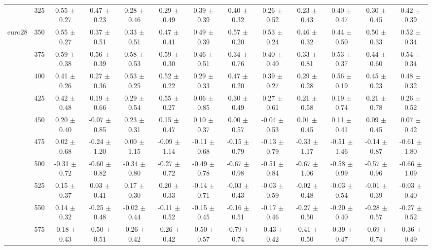 \begin{table}[h]
{\begin{tabular}{
        ccccccccccccc}
 & 325& 0.55 $\pm$ 0.27& 0.47 $\pm$ 0.23& 0.28 $\pm$ 0.46& 0.29 $\pm$ 0.49& 0.39 $\pm$ 0.39& 0.40 $\pm$ 0.32& 0.26 $\pm$ 0.52& 0.23 $\pm$ 0.43& 0.40 $\pm$ 0.47& 0.30 $\pm$ 0.45& 0.42 $\pm$ 0.39 \\ 
\multirow{4}{*}{euro28}& 350& 0.55 $\pm$ 0.27& 0.37 $\pm$ 0.51& 0.33 $\pm$ 0.51& 0.47 $\pm$ 0.41& 0.49 $\pm$ 0.39& 0.57 $\pm$ 0.20& 0.53 $\pm$ 0.24& 0.46 $\pm$ 0.32& 0.44 $\pm$ 0.50& 0.50 $\pm$ 0.33& 0.52 $\pm$ 0.34 \\ 
 & 375& 0.59 $\pm$ 0.38& 0.56 $\pm$ 0.39& 0.58 $\pm$ 0.53& 0.59 $\pm$ 0.30& 0.46 $\pm$ 0.51& 0.34 $\pm$ 0.76& 0.40 $\pm$ 0.40& 0.33 $\pm$ 0.81& 0.53 $\pm$ 0.37& 0.44 $\pm$ 0.60& 0.54 $\pm$ 0.34 \\ 
 & 400& 0.41 $\pm$ 0.26& 0.27 $\pm$ 0.36& 0.53 $\pm$ 0.25& 0.52 $\pm$ 0.22& 0.29 $\pm$ 0.33& 0.47 $\pm$ 0.20& 0.39 $\pm$ 0.27& 0.29 $\pm$ 0.28& 0.56 $\pm$ 0.19& 0.45 $\pm$ 0.23& 0.48 $\pm$ 0.32 \\ 
 & 425& 0.42 $\pm$ 0.48& 0.19 $\pm$ 0.66& 0.29 $\pm$ 0.54& 0.55 $\pm$ 0.27& 0.06 $\pm$ 0.85& 0.30 $\pm$ 0.49& 0.27 $\pm$ 0.61& 0.21 $\pm$ 0.58& 0.19 $\pm$ 0.74& 0.21 $\pm$ 0.78& 0.26 $\pm$ 0.52 \\ 
 & 450& 0.20 $\pm$ 0.40& -0.07 $\pm$ 0.85& 0.23 $\pm$ 0.31& 0.15 $\pm$ 0.47& 0.10 $\pm$ 0.37& 0.00 $\pm$ 0.57& -0.04 $\pm$ 0.53& 0.01 $\pm$ 0.45& 0.11 $\pm$ 0.41& 0.09 $\pm$ 0.45& 0.07 $\pm$ 0.42 \\ 
 & 475& 0.02 $\pm$ 0.68& -0.24 $\pm$ 1.20& 0.00 $\pm$ 1.15& -0.09 $\pm$ 1.14& -0.11 $\pm$ 0.68& -0.15 $\pm$ 0.79& -0.13 $\pm$ 0.79& -0.33 $\pm$ 1.17& -0.51 $\pm$ 1.46& -0.14 $\pm$ 0.87& -0.61 $\pm$ 1.80 \\ 
 & 500& -0.31 $\pm$ 0.72& -0.60 $\pm$ 0.82& -0.34 $\pm$ 0.80& -0.27 $\pm$ 0.72& -0.49 $\pm$ 0.78& -0.67 $\pm$ 0.98& -0.51 $\pm$ 0.84& -0.67 $\pm$ 1.06& -0.58 $\pm$ 0.99& -0.57 $\pm$ 0.96& -0.66 $\pm$ 1.09 \\ 
 & 525& 0.15 $\pm$ 0.37& 0.03 $\pm$ 0.41& 0.17 $\pm$ 0.30& 0.20 $\pm$ 0.33& -0.14 $\pm$ 0.71& -0.03 $\pm$ 0.43& -0.03 $\pm$ 0.59& -0.02 $\pm$ 0.48& -0.03 $\pm$ 0.54& -0.01 $\pm$ 0.39& -0.03 $\pm$ 0.40 \\ 
 & 550& 0.14 $\pm$ 0.32& -0.25 $\pm$ 0.48& -0.02 $\pm$ 0.44& -0.11 $\pm$ 0.52& -0.15 $\pm$ 0.45& -0.16 $\pm$ 0.51& -0.17 $\pm$ 0.46& -0.27 $\pm$ 0.50& -0.20 $\pm$ 0.40& -0.28 $\pm$ 0.57& -0.27 $\pm$ 0.52 \\ 
 & 575& -0.18 $\pm$ 0.43& -0.50 $\pm$ 0.51& -0.26 $\pm$ 0.42& -0.26 $\pm$ 0.42& -0.50 $\pm$ 0.57& -0.79 $\pm$ 0.74& -0.43 $\pm$ 0.42& -0.41 $\pm$ 0.50& -0.39 $\pm$ 0.47& -0.69 $\pm$ 0.74& -0.36 $\pm$ 0.49 \\ 

\end{tabular}}
\end{table}
